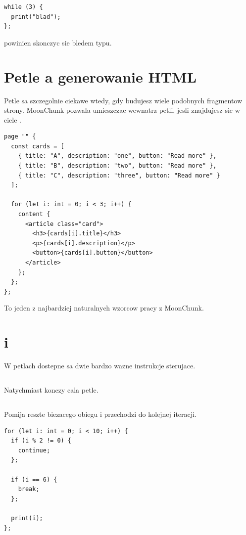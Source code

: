 \begin{lstlisting}[style=moonchunk,caption={Niepoprawny warunek petli}]
while (3) {
  print("blad");
};
\end{lstlisting}

powinien skonczyc sie bledem typu.

\section{Petle a generowanie HTML}
Petle sa szczegolnie ciekawe wtedy, gdy budujesz wiele podobnych fragmentow strony.
MoonChunk pozwala umieszczac  wewnatrz petli, jesli znajdujesz sie w ciele
.

\begin{lstlisting}[style=moonchunk,caption={Content generowany w petli}]
page "" {
  const cards = [
    { title: "A", description: "one", button: "Read more" },
    { title: "B", description: "two", button: "Read more" },
    { title: "C", description: "three", button: "Read more" }
  ];

  for (let i: int = 0; i < 3; i++) {
    content {
      <article class="card">
        <h3>{cards[i].title}</h3>
        <p>{cards[i].description}</p>
        <button>{cards[i].button}</button>
      </article>
    };
  };
};
\end{lstlisting}

To jeden z najbardziej naturalnych wzorcow pracy z MoonChunk.

\section{ i }
W petlach dostepne sa dwie bardzo wazne instrukcje sterujace.

\subsection*{}
Natychmiast konczy cala petle.

\subsection*{}
Pomija reszte biezacego obiegu i przechodzi do kolejnej iteracji.

\begin{lstlisting}[style=moonchunk,caption={break i continue w praktyce}]
for (let i: int = 0; i < 10; i++) {
  if (i % 2 != 0) {
    continue;
  };

  if (i == 6) {
    break;
  };

  print(i);
};
\end{lstlisting}

